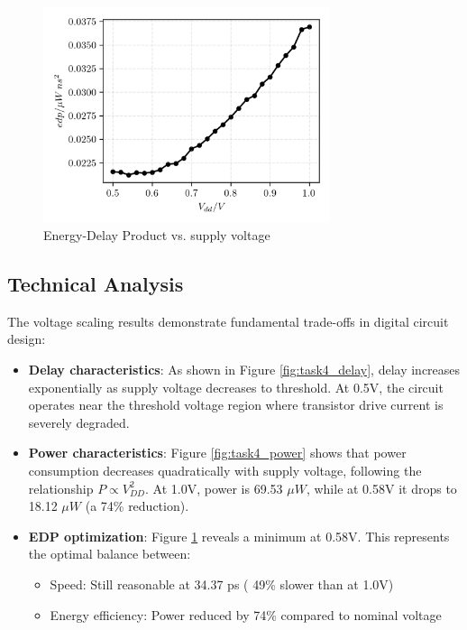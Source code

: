 \documentclass[UTF8,12pt,a4paper]{ctexart}
\begin{document}
\begin{figure}[h]
\centering
\includegraphics[width=0.75\textwidth]{Task4/edp_vs_volts.png}
\caption{Energy-Delay Product vs. supply voltage}
\label{fig:task4_edp}
\end{figure}

\subsection{Technical Analysis}

The voltage scaling results demonstrate fundamental trade-offs in digital circuit design:

\begin{itemize}
    \item[1.] \textbf{Delay characteristics}: As shown in Figure \ref{fig:task4_delay}, delay increases exponentially as supply voltage decreases to threshold. At 0.5V, the circuit operates near the threshold voltage region where transistor drive current is severely degraded.
    
    \item[2.] \textbf{Power characteristics}: Figure \ref{fig:task4_power} shows that power consumption decreases quadratically with supply voltage, following the relationship $P \propto V_{DD}^2$. At 1.0V, power is 69.53 $\mu W$, while at 0.58V it drops to 18.12 $\mu W$ (a 74\% reduction).
    
    \item[3.] \textbf{EDP optimization}: Figure \ref{fig:task4_edp} reveals a minimum at 0.58V. This represents the optimal balance between:
    \begin{itemize}
        \item Speed: Still reasonable at 34.37 ps ( 49\% slower than at 1.0V)
        \item Energy efficiency: Power reduced by 74\% compared to nominal voltage
    \end{itemize}
    
\end{itemize}
\end{document}
